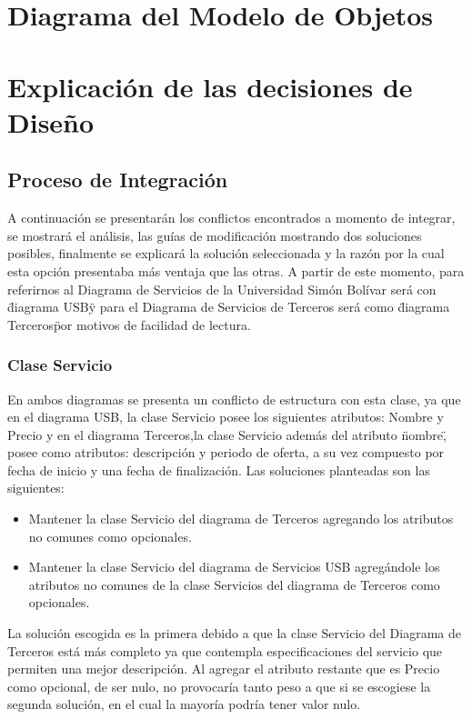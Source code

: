 \message{ !name(InformeFase2.tex)}\documentclass[12pt,a4paper,spanish]{article}
\begin{document}
\newpage

\section{Diagrama del Modelo de Objetos}

\newpage

\section{Explicaci\'on de las decisiones de Dise\~no}

 \subsection{Proceso de Integraci\'on}
 \indent A continuaci\'on se presentar\'an los conflictos encontrados a momento de integrar, se mostrar\'a el an\'alisis, las gu\'ias de modificaci\'on mostrando dos soluciones posibles, finalmente se explicar\'a la soluci\'on seleccionada y la raz\'on por la cual esta opci\'on presentaba m\'as ventaja que las otras. A partir de este momento, para referirnos al Diagrama de Servicios de la Universidad Sim\'on Bol\'ivar ser\'a con \"diagrama USB\" y para el Diagrama de Servicios de Terceros ser\'a como \"diagrama Terceros\" por motivos de facilidad de lectura. 
 \newline
 \subsubsection{Clase Servicio}
 \newline
 \indent En ambos diagramas se presenta un conflicto de estructura con esta clase, ya que en el diagrama USB, la clase Servicio posee los siguientes atributos: Nombre y Precio y en el diagrama Terceros,la clase Servicio adem\'as del atributo \"nombre\", posee como atributos: descripci\'on y periodo de oferta, a su vez compuesto por fecha de inicio y una fecha de finalizaci\'on.
\newline
\newline
\indent Las soluciones planteadas son las siguientes:
\begin{itemize}
\item Mantener la clase Servicio del diagrama de Terceros agregando los atributos no comunes como opcionales.
\item Mantener la clase Servicio del diagrama de Servicios USB agreg\'andole los atributos no comunes de la clase Servicios del diagrama de Terceros como opcionales. 
\end{itemize}
\newline
\indent La soluci\'on escogida es la primera debido a que la clase Servicio del Diagrama de Terceros est\'a m\'as completo ya que contempla especificaciones del servicio que permiten una mejor descripci\'on. Al agregar el atributo restante que es Precio como opcional, de ser nulo, no provocar\'ia tanto peso a que si se escogiese la segunda soluci\'on, en el cual la mayor\'ia podr\'ia tener valor nulo.
\newline
\end{document}

